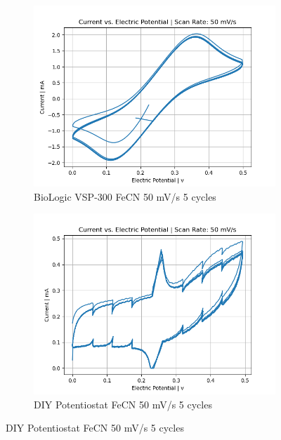 \documentclass{article}
\begin{document}
\begin{figure}[H]
  \begin{subfigure}[b]{0.45\textwidth}
    \includegraphics[width=\textwidth]{FECN_50mVs_5cycles_lab.png}
    \caption{BioLogic VSP-300 FeCN 50 mV/s 5 cycles}
  \end{subfigure}
  \hfill
  \begin{subfigure}[b]{0.45\textwidth}
    \includegraphics[width=\textwidth]{FECN_50mVs_5cycles.png}
    \caption{DIY Potentiostat FeCN 50 mV/s 5 cycles}
  \end{subfigure}


\end{figure}
\end{document}

